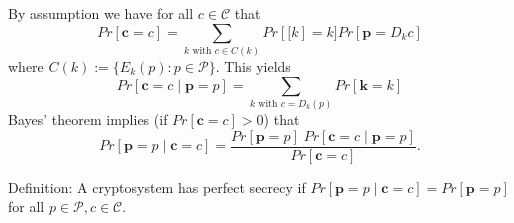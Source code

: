 By assumption we have for all $c ∈ \mathcal{C}$ that
$$Pr[\mathbf{c} = c] = \sum_{k \text{ with } c ∈ C(k)}
Pr[\mathbf[k] = k] Pr[\mathbf{p} = D_k{c}]
$$
where $C(k) := \lbrace{E_k(p) : p ∈ \mathcal{P}}\rbrace$. This yields
$$Pr[\mathbf{c} = c \mid \mathbf{p} = p] =
\sum_{k \text{ with } c = D_k(p)} Pr[\mathbf{k} = k]
$$
Bayes' theorem implies (if $Pr[\mathbf{c} = c] > 0$) that
$$Pr[\mathbf{p} = p \mid \mathbf{c} = c] =
\frac{Pr[\mathbf{p} = p] \; Pr[\mathbf{c} = c \mid \mathbf{p} = p]}
     {Pr[\mathbf{c} = c]}.
$$

Definition: A cryptosystem has perfect secrecy if $Pr[\mathbf{p} = p \mid \mathbf{c} = c] = Pr[\mathbf{p} = p]$ for all $p ∈ \mathcal{P},c ∈ \mathcal{C}$.
